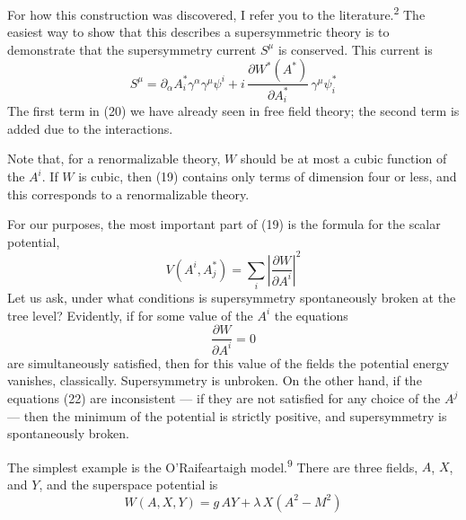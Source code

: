 For how this construction was discovered, I refer you to the literature.\textsuperscript{2}
The easiest way to show that this describes a supersymmetric
theory is to demonstrate that the supersymmetry current $S^\mu$ is conserved.
This current is
\begin{equation}
S^\mu = \partial_\alpha A_i^* \gamma^\alpha \gamma^\mu \psi^i + i\, \frac{\partial W^*(A^*)}{\partial A_i^*}\, \gamma^\mu \psi_i^*
\tag{20}
\end{equation}
The first term in (20) we have already seen in free field theory;
the second term is added due to the interactions.

Note that, for a renormalizable theory, $W$ should be at most a
cubic function of the $A^i$. If $W$ is cubic, then (19) contains only
terms of dimension four or less, and this corresponds to a renormalizable
theory.

For our purposes, the most important part of (19) is the formula
for the scalar potential,
\begin{equation}
V(A^i, A_j^*) = \sum_i \left|\frac{\partial W}{\partial A^i}\right|^2
\tag{21}
\end{equation}
Let us ask, under what conditions is supersymmetry spontaneously
broken at the tree level? Evidently, if for some value of the $A^i$
the equations
\begin{equation}
\frac{\partial W}{\partial A^i} = 0
\tag{22}
\end{equation}
are simultaneously satisfied, then for this value of the fields the
potential energy vanishes, classically. Supersymmetry is unbroken.
On the other hand, if the equations (22) are inconsistent --- if they
are not satisfied for any choice of the $A^j$ --- then the minimum of the
potential is strictly positive, and supersymmetry is spontaneously
broken.

The simplest example is the O'Raifeartaigh model.\textsuperscript{9} There are
three fields, $A$, $X$, and $Y$, and the superspace potential is
\begin{equation}
W(A, X, Y) = g\, A Y + \lambda\, X (A^2 - M^2)
\tag{23}
\end{equation}

